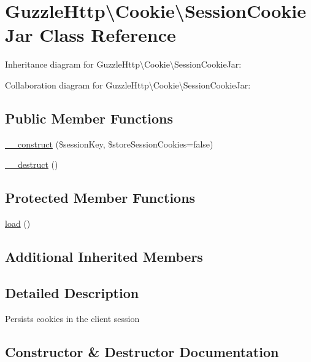 \hypertarget{classGuzzleHttp_1_1Cookie_1_1SessionCookieJar}{}\section{Guzzle\+Http\textbackslash{}Cookie\textbackslash{}Session\+Cookie\+Jar Class Reference}
\label{classGuzzleHttp_1_1Cookie_1_1SessionCookieJar}


Inheritance diagram for Guzzle\+Http\textbackslash{}Cookie\textbackslash{}Session\+Cookie\+Jar\+:


Collaboration diagram for Guzzle\+Http\textbackslash{}Cookie\textbackslash{}Session\+Cookie\+Jar\+:
\subsection*{Public Member Functions}
\begin{DoxyCompactItemize}
\item 
\hyperlink{classGuzzleHttp_1_1Cookie_1_1SessionCookieJar_a8fc868cfd6cbd9121445387c2daf40c4}{\+\_\+\+\_\+construct} (\$session\+Key, \$store\+Session\+Cookies=false)
\item 
\hyperlink{classGuzzleHttp_1_1Cookie_1_1SessionCookieJar_a613ba9b91784d4de8342f2f005a59881}{\+\_\+\+\_\+destruct} ()
\end{DoxyCompactItemize}
\subsection*{Protected Member Functions}
\begin{DoxyCompactItemize}
\item 
\hyperlink{classGuzzleHttp_1_1Cookie_1_1SessionCookieJar_a160dd1223fef2c1d8c0c7d7fed667f92}{load} ()
\end{DoxyCompactItemize}
\subsection*{Additional Inherited Members}


\subsection{Detailed Description}
Persists cookies in the client session 

\subsection{Constructor \& Destructor Documentation}
\mbox{\label{classGuzzleHttp_1_1Cookie_1_1SessionCookieJar_a8fc868cfd6cbd9121445387c2daf40c4}} 
